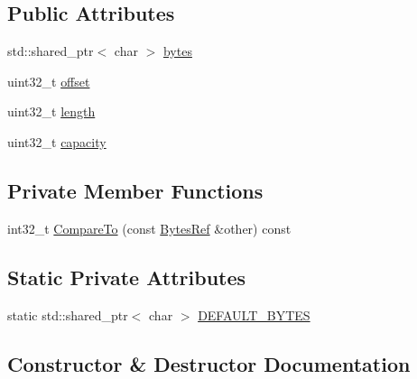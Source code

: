 \subsection*{Public Attributes}
\begin{DoxyCompactItemize}
\item 
std\+::shared\+\_\+ptr$<$ char $>$ \mbox{\hyperlink{classlucene_1_1core_1_1util_1_1BytesRef_a50b260da81b7f31687ac167ff52c9a1c}{bytes}}
\item 
uint32\+\_\+t \mbox{\hyperlink{classlucene_1_1core_1_1util_1_1BytesRef_a00b5e81a37602c7af1fde636cd44f12b}{offset}}
\item 
uint32\+\_\+t \mbox{\hyperlink{classlucene_1_1core_1_1util_1_1BytesRef_a198e62928759942ffc9d2c3ff877b4e4}{length}}
\item 
uint32\+\_\+t \mbox{\hyperlink{classlucene_1_1core_1_1util_1_1BytesRef_a9e1775d26ac1dec137aa57fae87f654c}{capacity}}
\end{DoxyCompactItemize}
\subsection*{Private Member Functions}
\begin{DoxyCompactItemize}
\item 
int32\+\_\+t \mbox{\hyperlink{classlucene_1_1core_1_1util_1_1BytesRef_a028de5040f03a4f1508986699263f952}{Compare\+To}} (const \mbox{\hyperlink{classlucene_1_1core_1_1util_1_1BytesRef}{Bytes\+Ref}} \&other) const
\end{DoxyCompactItemize}
\subsection*{Static Private Attributes}
\begin{DoxyCompactItemize}
\item 
static std\+::shared\+\_\+ptr$<$ char $>$ \mbox{\hyperlink{classlucene_1_1core_1_1util_1_1BytesRef_abcb0c93627877d9d8b01889830e879b0}{D\+E\+F\+A\+U\+L\+T\+\_\+\+B\+Y\+T\+ES}}
\end{DoxyCompactItemize}


\subsection{Constructor \& Destructor Documentation}
\mbox{\label{classlucene_1_1core_1_1util_1_1BytesRef_a5c352a399671a6ed5e04cd334149b662}} 
